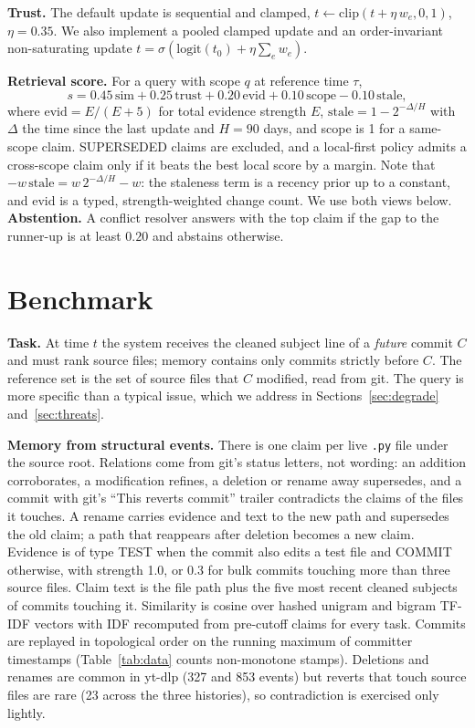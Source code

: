 \documentclass[runningheads]{llncs}
\begin{document}
\textbf{Trust.} The default update is sequential and clamped, $t \leftarrow \mathrm{clip}(t + \eta\, w_e,0,1)$, $\eta=0.35$. We also implement a pooled clamped update and an order-invariant non-saturating update $t=\sigma(\mathrm{logit}(t_0)+\eta\sum_e w_e)$.

\textbf{Retrieval score.} For a query with scope $q$ at reference time $\tau$,
\begin{equation}
s = 0.45\,\mathrm{sim} + 0.25\,\mathrm{trust} + 0.20\,\mathrm{evid} + 0.10\,\mathrm{scope} - 0.10\,\mathrm{stale},
\end{equation}
where $\mathrm{evid}=E/(E+5)$ for total evidence strength $E$, $\mathrm{stale}=1-2^{-\Delta/H}$ with $\Delta$ the time since the last update and $H=90$ days, and scope is 1 for a same-scope claim. SUPERSEDED claims are excluded, and a local-first policy admits a cross-scope claim only if it beats the best local score by a margin. Note that $-w\,\mathrm{stale}=w\,2^{-\Delta/H}-w$: the staleness term is a recency prior up to a constant, and $\mathrm{evid}$ is a typed, strength-weighted change count. We use both views below. \textbf{Abstention.} A conflict resolver answers with the top claim if the gap to the runner-up is at least $0.20$ and abstains otherwise.

\section{Benchmark}
\label{sec:bench}
\textbf{Task.} At time $t$ the system receives the cleaned subject line of a \emph{future} commit $C$ and must rank source files; memory contains only commits strictly before $C$. The reference set is the set of source files that $C$ modified, read from git. The query is more specific than a typical issue, which we address in Sections~\ref{sec:degrade} and~\ref{sec:threats}.

\textbf{Memory from structural events.} There is one claim per live \texttt{.py} file under the source root. Relations come from git's status letters, not wording: an addition corroborates, a modification refines, a deletion or rename away supersedes, and a commit with git's ``This reverts commit'' trailer contradicts the claims of the files it touches. A rename carries evidence and text to the new path and supersedes the old claim; a path that reappears after deletion becomes a new claim. Evidence is of type TEST when the commit also edits a test file and COMMIT otherwise, with strength 1.0, or 0.3 for bulk commits touching more than three source files. Claim text is the file path plus the five most recent cleaned subjects of commits touching it. Similarity is cosine over hashed unigram and bigram TF-IDF vectors with IDF recomputed from pre-cutoff claims for every task. Commits are replayed in topological order on the running maximum of committer timestamps (Table~\ref{tab:data} counts non-monotone stamps). Deletions and renames are common in yt-dlp (327 and 853 events) but reverts that touch source files are rare (23 across the three histories), so contradiction is exercised only lightly.
\end{document}
